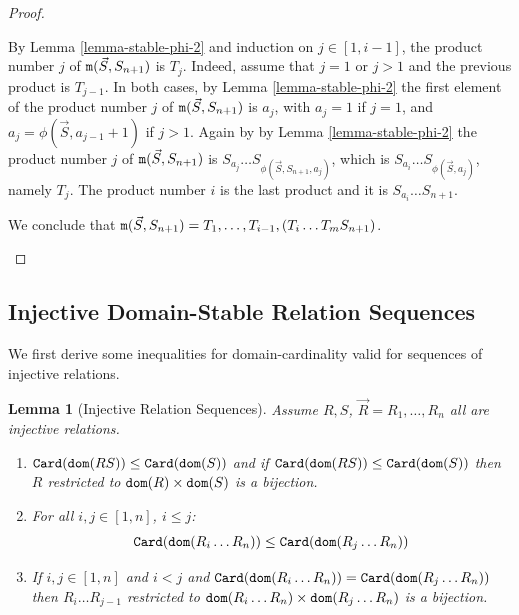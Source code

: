 \documentclass{lmcs}
\newtheorem{lemma}[theorem]{Lemma}
\begin{document}
\begin{proof}
\begin{enumerate}
\begin{enumerate}
By Lemma \ref{lemma-stable-phi-2} and induction on $j \in [1,i-1]$,
the product number $j$ of ${\tt m}(\vec{S},S_{n+1})$ is $T_j$.
Indeed, assume that $j=1$ or $j>1$ and the previous product is $T_{j-1}$.
In both cases, by Lemma \ref{lemma-stable-phi-2} the first element
of the product number $j$ of ${\tt m}(\vec{S},S_{n+1})$
is $a_j$, with $a_j = 1$ if $j=1$, and $a_j = \phi(\vec{S},a_ {j-1}+1)$ if $j>1$. 
Again by by Lemma \ref{lemma-stable-phi-2} the product number $j$ 
of ${\tt m}(\vec{S},S_{n+1})$ is $S_{a_j} \ldots S_{\phi(\vec{S},S_{n+1},a_j)}$, 
which is $S_{a_i} \ldots S_{\phi(\vec{S},a_j)}$, namely $T_j$.
The product number $i$ is the last product and it is $S_{a_i} \ldots S_{n+1}$.

We conclude that 
${\tt m}(\vec{S}, S_{n+1}) = T_1, \ldots, T_{i-1}, (T_i \ldots T_m S_{n+1})$.
\end{enumerate}
\end{enumerate}
\end{proof}



\subsection{Injective Domain-Stable Relation Sequences}

We first derive some inequalities for domain-cardinality
valid for sequences of injective relations.

\begin{lemma}[Injective Relation Sequences]
\label{lemma-stable-sequences}
Assume $R, S$, $\vec{R}=R_1, \ldots, R_n$ all are \emph{injective} relations.
\begin{enumerate}
\item
${\tt Card}({\tt dom}(RS)) \le {\tt Card}({\tt dom}(S))$
and if ${\tt Card}({\tt dom}(RS)) \le {\tt Card}({\tt dom}(S))$ then $R$ restricted to ${\tt dom}(R) \times {\tt dom}(S)$
is a bijection.

\item
For all $i,j \in [1,n]$, $i \le j$:
$$
{\tt Card}({\tt dom}(R_i \ldots R_n)) \le {\tt Card}({\tt dom}(R_j \ldots R_n))
$$

\item
If  $i, j \in[1,n]$ and $i < j$ and ${\tt Card}({\tt dom}(R_i \ldots R_n)) = {\tt Card}({\tt dom}(R_j \ldots R_n))$
then $R_i \ldots R_{j-1}$ restricted to ${\tt dom}(R_i \ldots R_n) \times {\tt dom}(R_j \ldots R_n)$
is a bijection.
\end{enumerate}
\end{lemma}
\end{document}
